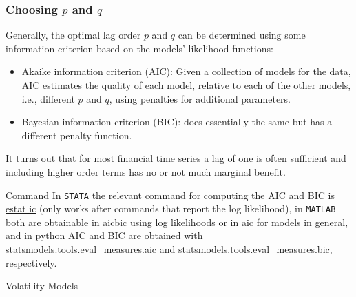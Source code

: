 \documentclass[xcolor=dvipsnames, english, 8pt]{beamer}
\begin{document}
\begin{frame}
    \frametitle{Choosing $p$ and $q$}
    Generally, the optimal lag order $p$ and $q$ can be determined using some information criterion based on the models' likelihood functions:\vspace{0.25cm}\\
    \begin{itemize}
        \item {\color{ubRed} Akaike information criterion (AIC)}: Given a collection of models for the data, AIC estimates the quality of each model, relative to each of the other models, i.e., different $p$ and $q$, using penalties for additional parameters.
        \item {\color{ubRed} Bayesian information criterion (BIC)}: does essentially the same but has a different penalty function.\vspace{0.25cm}\\
    \end{itemize}
    It turns out that for most financial time series a lag of one is often sufficient and including higher order terms has no or not much marginal benefit.
    \vfill
    \begin{exampleblock}{{\small{Command}}}
    In  \texttt{STATA} the relevant command for computing the AIC and BIC is \href{https://www.stata.com/manuals13/restatic.pdf}{\color{Purple}estat ic} (only
works after commands that report the log likelihood), in \texttt{MATLAB} both are obtainable in \href{https://ch.mathworks.com/help/econ/aicbic.html}{\color{Purple}aicbic} using log likelihoods or in \href{https://ch.mathworks.com/help/ident/ref/aic.html}{\color{Purple}aic} for models in general, and in python AIC and BIC are obtained with  statsmodels.tools.eval\_measures.\href{https://www.statsmodels.org/stable/generated/statsmodels.tools.eval_measures.aic.html}{\color{Purple}aic} and  statsmodels.tools.eval\_measures.\href{https://www.statsmodels.org/stable/generated/statsmodels.tools.eval_measures.bic.html}{\color{Purple}bic}, respectively.
    \end{exampleblock}
\end{frame}

\begin{frame}[label=vola]
    \begin{center}
        {\color{ubRed} \Huge{Volatility Models}}
    \end{center}
\end{frame}
\end{document}
